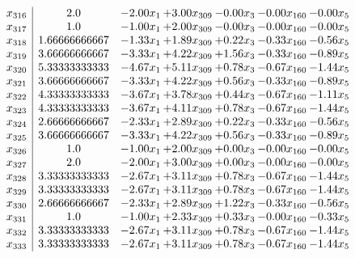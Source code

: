\documentclass[8pt]{article}
\begin{document}
\[\begin{array}{c| c c@{\hskip 2pt} c@{\hskip 2pt} c@{\hskip 2pt} c@{\hskip 2pt} c@{\hskip 2pt} }
 x_{316}   &  2.0 & -2.00 x_{1} & +  3.00 x_{309} & -0.00 x_{3} & -0.00 x_{160} & -0.00 x_{5}\\
 x_{317}   &  1.0 & -1.00 x_{1} & +  2.00 x_{309} & -0.00 x_{3} & -0.00 x_{160} & -0.00 x_{5}\\
 x_{318}   &  1.66666666667 & -1.33 x_{1} & +  1.89 x_{309} & +  0.22 x_{3} & -0.33 x_{160} & -0.56 x_{5}\\
 x_{319}   &  3.66666666667 & -3.33 x_{1} & +  4.22 x_{309} & +  1.56 x_{3} & -0.33 x_{160} & -0.89 x_{5}\\
 x_{320}   &  5.33333333333 & -4.67 x_{1} & +  5.11 x_{309} & +  0.78 x_{3} & -0.67 x_{160} & -1.44 x_{5}\\
 x_{321}   &  3.66666666667 & -3.33 x_{1} & +  4.22 x_{309} & +  0.56 x_{3} & -0.33 x_{160} & -0.89 x_{5}\\
 x_{322}   &  4.33333333333 & -3.67 x_{1} & +  3.78 x_{309} & +  0.44 x_{3} & -0.67 x_{160} & -1.11 x_{5}\\
 x_{323}   &  4.33333333333 & -3.67 x_{1} & +  4.11 x_{309} & +  0.78 x_{3} & -0.67 x_{160} & -1.44 x_{5}\\
 x_{324}   &  2.66666666667 & -2.33 x_{1} & +  2.89 x_{309} & +  0.22 x_{3} & -0.33 x_{160} & -0.56 x_{5}\\
 x_{325}   &  3.66666666667 & -3.33 x_{1} & +  4.22 x_{309} & +  0.56 x_{3} & -0.33 x_{160} & -0.89 x_{5}\\
 x_{326}   &  1.0 & -1.00 x_{1} & +  2.00 x_{309} & +  0.00 x_{3} & -0.00 x_{160} & -0.00 x_{5}\\
 x_{327}   &  2.0 & -2.00 x_{1} & +  3.00 x_{309} & +  0.00 x_{3} & -0.00 x_{160} & -0.00 x_{5}\\
 x_{328}   &  3.33333333333 & -2.67 x_{1} & +  3.11 x_{309} & +  0.78 x_{3} & -0.67 x_{160} & -1.44 x_{5}\\
 x_{329}   &  3.33333333333 & -2.67 x_{1} & +  3.11 x_{309} & +  0.78 x_{3} & -0.67 x_{160} & -1.44 x_{5}\\
 x_{330}   &  2.66666666667 & -2.33 x_{1} & +  2.89 x_{309} & +  1.22 x_{3} & -0.33 x_{160} & -0.56 x_{5}\\
 x_{331}   &  1.0 & -1.00 x_{1} & +  2.33 x_{309} & +  0.33 x_{3} & -0.00 x_{160} & -0.33 x_{5}\\
 x_{332}   &  3.33333333333 & -2.67 x_{1} & +  3.11 x_{309} & +  0.78 x_{3} & -0.67 x_{160} & -1.44 x_{5}\\
 x_{333}   &  3.33333333333 & -2.67 x_{1} & +  3.11 x_{309} & +  0.78 x_{3} & -0.67 x_{160} & -1.44 x_{5}\\

\end{array}\]
\end{document}
